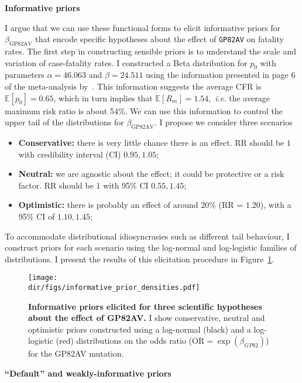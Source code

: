 \textbf{Informative priors}

I argue that we can use these functional forms to elicit informative priors for $\beta_{\text{GP82AV}}$ that encode specific hypotheses about the effect of \verb|GP82AV| on fatality rates.
The first step in constructing sensible priors is to understand the scale and variation of case-fatality rates.
I constructed a Beta distribution for $p_0$  with parameters $\alpha = 46.063$ and $\beta = 24.511$ using the information presented in page 6 of the meta-analysis by~\cite{Nyakarahuka2016}.
This information suggests the average CFR is $\mathbb{E}[p_0]= 0.65$, which in turn implies that $\mathbb{E}[R_m] = 1.54$,~\textit{i.e.} the average maximum risk ratio is about 54\%.
We can use this information to control the upper tail of the distributions for $\beta_{\text{GP82AV}}$.
I propose we consider three scenarios
\begin{itemize}
 \item \textbf{Conservative:} there is very little chance there is an effect.
 RR should be $1$ with credibility interval (CI) $0.95, 1.05$;
 \item \textbf{Neutral:} we are agnostic about the effect; it could be protective or a risk factor.
 RR should be $1$ with 95\% CI $0.55, 1.45$;
 \item \textbf{Optimistic:} there is probably an effect of around $20$\% (RR = $1.20$), with a 95\% CI of $1.10, 1.45$;
\end{itemize}
To accommodate distributional idiosyncrasies such as different tail behaviour, I construct priors for each scenario using the log-normal and log-logistic families of distributions.
I present the results of this elicitation procedure in Figure~\ref{fig:informativePriors}.

\begin{figure}[!ht]
  \centering
  \texttt{[image: \\dir/figs/informative\_prior\_densities.pdf]}
  \caption[Informative priors for the effect of GP82AV]{\textbf{Informative priors elicited for three scientific hypotheses about the effect of GP82AV.}
  I show conservative, neutral and optimistic priors constructed using a log-normal (black) and a log-logistic (red) distributions on the odds ratio ($\text{OR} = \exp(\beta_{GP82})$) for the GP82AV mutation.
  }
  \label{fig:informativePriors}
\end{figure}

\textbf{``Default'' and weakly-informative priors}

